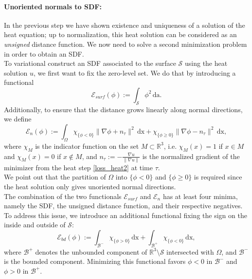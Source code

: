 \documentclass[12pt,openany]{book}
\newcommand{\R}{\mathbb{R}}
\def\S{\mathcal{S}}
\theoremstyle{plainnormal}
\theoremstyle{remark}
\begin{document}
\paragraph{Unoriented normals to SDF:}
In the previous step we have shown existence and uniqueness of a solution of the heat equation; up to normalization, this heat solution can be considered as an \emph{unsigned} distance function. We now need to solve a second minimization problem in order to obtain an SDF.\\
To variational construct an SDF associated to the surface $\mathcal{S}$ using the heat solution $u$, we first want to fix the zero-level set. We do that by introducing a functional $$\mathcal{E}_{surf}(\phi) := \int_\mathcal{S} \phi^2 \,\mathrm{da}.$$
Additionally, to ensure that the distance grows linearly along normal directions, we define $$\mathcal{E}_{n}(\phi) := \int_\Omega \chi_{\{\phi < 0\}} \|\nabla \phi + n_\tau\|^2 \,\mathrm{dx} + \chi_{\{\phi \geq 0\}} \|\nabla \phi - n_\tau\|^2 \,\mathrm{dx},$$
where $\chi_M$ is the indicator function on the set $M\subset \R^3$, i.e. $\chi_M(x) = 1$ if $x\in M$ and $\chi_M(x) = 0$ if $x\notin M$, and  $n_\tau := - \frac{\nabla u}{\|\nabla u\|}$ is the normalized gradient of the minimizer from the heat step \eqref{loss_heat2} at time $\tau$.\\ 
We point out that the partition of $\Omega$ into $\{\phi < 0\}$ and $\{\phi \geq 0\}$ is required since the heat solution only gives unoriented normal directions.\\
The combination of the two functionals $\mathcal E_{surf}$ and $\mathcal E_{n}$ has at least four minima, namely the SDF, the unsigned distance function, and their respective negatives. To address this issue, we introduce an additional functional fixing the sign on the inside and outside of $\S$: 
$$\mathcal{E}_{bd}(\phi) := \int_{\mathcal{B^-}} \chi_{\{\phi > 0\}} \,\mathrm{dx} + \int_{\mathcal{B^+}}\chi_{\{\phi < 0\}} \,\mathrm{dx},$$
where $\mathcal{B}^+$ denotes the unbounded component of $\R^3\setminus\S$ intersected with $\Omega$, and $\mathcal{B}^-$ is the bounded component. Minimizing this functional favors $\phi < 0$ in $\mathcal B^-$ and $\phi> 0$ in $\mathcal B^+$.\\
\end{document}
